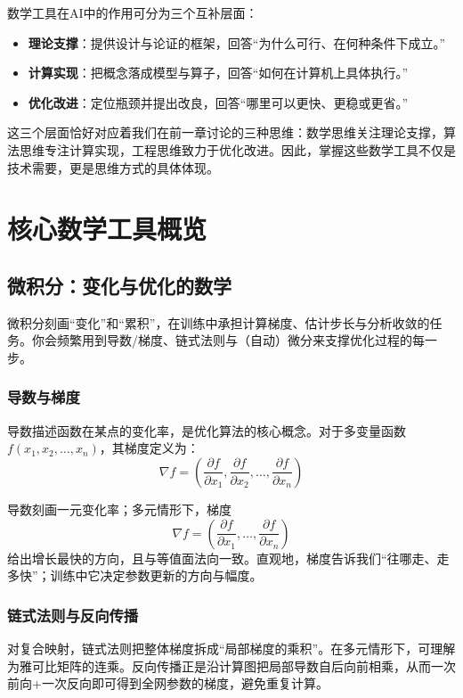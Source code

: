 数学工具在AI中的作用可分为三个互补层面：
\begin{itemize}
\item \textbf{理论支撑}：提供设计与论证的框架，回答“为什么可行、在何种条件下成立。” 
\item \textbf{计算实现}：把概念落成模型与算子，回答“如何在计算机上具体执行。” 
\item \textbf{优化改进}：定位瓶颈并提出改良，回答“哪里可以更快、更稳或更省。” 
\end{itemize}

这三个层面恰好对应着我们在前一章讨论的三种思维：数学思维关注理论支撑，算法思维专注计算实现，工程思维致力于优化改进。因此，掌握这些数学工具不仅是技术需要，更是思维方式的具体体现。

\section{核心数学工具概览}

\subsection{微积分：变化与优化的数学}

微积分刻画“变化”和“累积”，在训练中承担计算梯度、估计步长与分析收敛的任务。你会频繁用到导数/梯度、链式法则与（自动）微分来支撑优化过程的每一步。

\subsubsection{导数与梯度}
导数描述函数在某点的变化率，是优化算法的核心概念。对于多变量函数$f(x_1, x_2, \ldots, x_n)$，其梯度定义为：
$$
\nabla f = \left(\frac{\partial f}{\partial x_1}, \frac{\partial f}{\partial x_2}, \ldots, \frac{\partial f}{\partial x_n}\right)$$

导数刻画一元变化率；多元情形下，梯度
$$
\nabla f = \left(\frac{\partial f}{\partial x_1}, \ldots, \frac{\partial f}{\partial x_n}\right)
$$
给出增长最快的方向，且与等值面法向一致。直观地，梯度告诉我们“往哪走、走多快”；训练中它决定参数更新的方向与幅度。

\subsubsection{链式法则与反向传播}

对复合映射，链式法则把整体梯度拆成“局部梯度的乘积”。在多元情形下，可理解为雅可比矩阵的连乘。反向传播正是沿计算图把局部导数自后向前相乘，从而一次前向+一次反向即可得到全网参数的梯度，避免重复计算。

